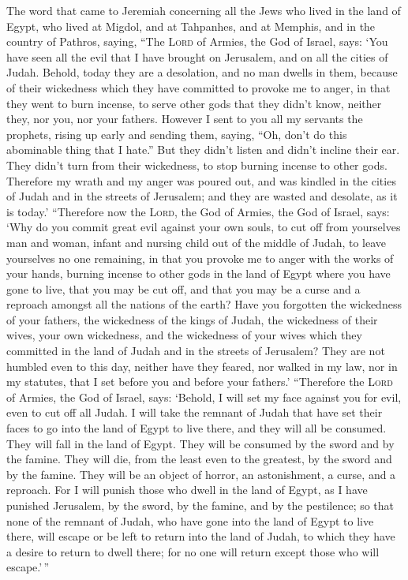  The word that came to Jeremiah concerning all the Jews
who lived in the land of Egypt, who lived at Migdol, and at Tahpanhes,
and at Memphis, and in the country of Pathros, saying, 
``The \textsc{Lord} of Armies, the God of Israel, says: `You have seen
all the evil that I have brought on Jerusalem, and on all the cities of
Judah. Behold, today they are a desolation, and no man dwells in them,
 because of their wickedness which they have committed to
provoke me to anger, in that they went to burn incense, to serve other
gods that they didn't know, neither they, nor you, nor your fathers.
 However I sent to you all my servants the prophets,
rising up early and sending them, saying, ``Oh, don't do this abominable
thing that I hate.''  But they didn't listen and didn't
incline their ear. They didn't turn from their wickedness, to stop
burning incense to other gods.  Therefore my wrath and my
anger was poured out, and was kindled in the cities of Judah and in the
streets of Jerusalem; and they are wasted and desolate, as it is today.'
 ``Therefore now the \textsc{Lord}, the God of Armies, the
God of Israel, says: `Why do you commit great evil against your own
souls, to cut off from yourselves man and woman, infant and nursing
child out of the middle of Judah, to leave yourselves no one remaining,
 in that you provoke me to anger with the works of your
hands, burning incense to other gods in the land of Egypt where you have
gone to live, that you may be cut off, and that you may be a curse and a
reproach amongst all the nations of the earth?  Have you
forgotten the wickedness of your fathers, the wickedness of the kings of
Judah, the wickedness of their wives, your own wickedness, and the
wickedness of your wives which they committed in the land of Judah and
in the streets of Jerusalem?  They are not humbled even
to this day, neither have they feared, nor walked in my law, nor in my
statutes, that I set before you and before your fathers.'
 ``Therefore the \textsc{Lord} of Armies, the God of
Israel, says: `Behold, I will set my face against you for evil, even to
cut off all Judah.  I will take the remnant of Judah that
have set their faces to go into the land of Egypt to live there, and
they will all be consumed. They will fall in the land of Egypt. They
will be consumed by the sword and by the famine. They will die, from the
least even to the greatest, by the sword and by the famine. They will be
an object of horror, an astonishment, a curse, and a reproach.
 For I will punish those who dwell in the land of Egypt,
as I have punished Jerusalem, by the sword, by the famine, and by the
pestilence;  so that none of the remnant of Judah, who
have gone into the land of Egypt to live there, will escape or be left
to return into the land of Judah, to which they have a desire to return
to dwell there; for no one will return except those who will
escape.'\,''


